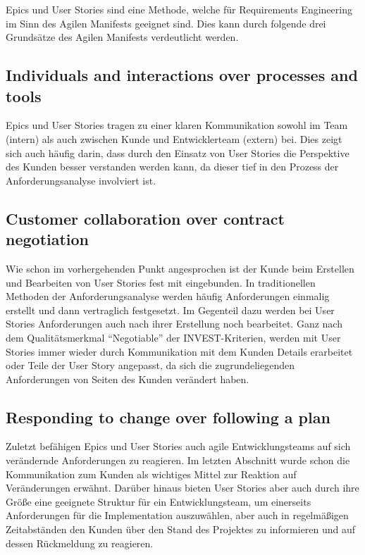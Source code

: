 \documentclass[acmtog]{acmart}
\begin{document}

Epics und User Stories sind eine Methode, welche für Requirements Engineering im Sinn des Agilen Manifests \cite{agile_manifesto_2001} geeignet sind.
Dies kann durch folgende drei Grundsätze des Agilen Manifests verdeutlicht werden.

\subsection{Individuals and interactions over processes and tools}
Epics und User Stories tragen zu einer klaren Kommunikation sowohl im Team (intern) als auch zwischen Kunde und Entwicklerteam (extern) bei.
Dies zeigt sich auch häufig darin, dass durch den Einsatz von User Stories die Perspektive des Kunden besser verstanden werden kann,
da dieser tief in den Prozess der Anforderungsanalyse involviert ist.

\subsection{Customer collaboration over contract negotiation}
Wie schon im vorhergehenden Punkt angesprochen ist der Kunde beim Erstellen und Bearbeiten von User Stories fest mit eingebunden.
In traditionellen Methoden der Anforderungsanalyse werden häufig Anforderungen einmalig erstellt und dann vertraglich festgesetzt.
Im Gegenteil dazu werden bei User Stories Anforderungen auch nach ihrer Erstellung noch bearbeitet.
Ganz nach dem Qualitätsmerkmal ``Negotiable'' der INVEST-Kriterien, werden mit User Stories
immer wieder durch Kommunikation mit dem Kunden Details erarbeitet oder Teile der User Story angepasst, da sich die zugrundeliegenden
Anforderungen von Seiten des Kunden verändert haben.

\subsection{Responding to change over following a plan}
Zuletzt befähigen Epics und User Stories auch agile Entwicklungsteams auf sich verändernde Anforderungen zu reagieren.
Im letzten Abschnitt wurde schon die Kommunikation zum Kunden als wichtiges Mittel zur Reaktion auf Veränderungen erwähnt.
Darüber hinaus bieten User Stories aber auch durch ihre Größe eine geeignete Struktur für ein Entwicklungsteam, um einerseits
Anforderungen für die Implementation auszuwählen, aber auch in regelmäßigen Zeitabständen den Kunden über den
Stand des Projektes zu informieren und auf dessen Rückmeldung zu reagieren.
\end{document}
